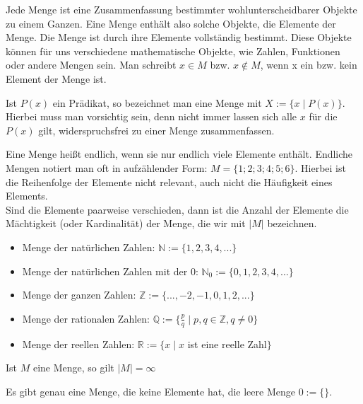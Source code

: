 \begin{overview}[Mengenlehre]
	Jede Menge ist eine Zusammenfassung bestimmter wohlunterscheidbarer Objekte zu einem Ganzen. Eine
	Menge enthält also solche Objekte, die Elemente der Menge. Die Menge ist durch ihre Elemente
	vollständig bestimmt. Diese Objekte können für uns verschiedene mathematische Objekte, wie
	Zahlen, Funktionen oder andere Mengen sein. Man schreibt $x \in M$ bzw. $x \notin M$, wenn x ein
	bzw. kein Element der Menge ist.
	
	Ist $P(x)$ ein Prädikat, so bezeichnet man eine Menge mit $X := \{x \mid P(x)\}$. Hierbei muss
	man vorsichtig sein, denn nicht immer lassen sich alle $x$ für die $P(x)$ gilt, widerspruchsfrei
	zu einer Menge zusammenfassen.
\end{overview}

\begin{example}
	Eine Menge heißt endlich, wenn sie nur endlich viele Elemente enthält. Endliche Mengen
	notiert man oft in aufzählender Form: $M = \{1;2;3;4;5;6\}$. Hierbei ist die Reihenfolge
	der Elemente nicht relevant, auch nicht die Häufigkeit eines Elements. \\
	Sind die Elemente paarweise verschieden, dann ist die Anzahl der Elemente die Mächtigkeit
	(oder Kardinalität) der Menge, die wir mit $|M|$ bezeichnen.
\end{example}

\begin{example}
	\begin{itemize}
		\item Menge der natürlichen Zahlen: $\mathbb N := \{1,2,3,4,...\}$
		\item Menge der natürlichen Zahlen mit der 0: $\mathbb N_0 := \{0,1,2,3,4,...\}$
		\item Menge der ganzen Zahlen: $\mathbb Z := \{...,-2,-1,0,1,2,...\}$
		\item Menge der rationalen Zahlen: $\mathbb Q := \{\frac p q \mid p,q \in \mathbb Z, q 
		\neq 0\}$
		\item Menge der reellen Zahlen: $\mathbb R := \{x \mid x$ ist eine reelle Zahl$\}$
	\end{itemize}
	Ist $M$ eine Menge, so gilt $|M|=\infty$
\end{example}

\begin{example}
	Es gibt genau eine Menge, die keine Elemente hat, die leere Menge $0 := \{\}$.
\end{example}


